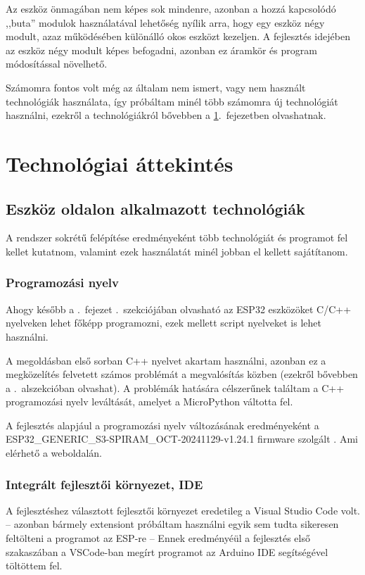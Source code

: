 \documentclass{thesis-ekf}
\theoremstyle{definition}
\theoremstyle{remark}
\begin{document}
	Az eszköz önmagában nem képes sok mindenre, azonban a hozzá kapcsolódó ,,buta'' modulok használatával lehetőség nyílik arra, hogy egy eszköz négy modult, azaz működésében különálló okos eszközt kezeljen.
	A fejlesztés idejében az eszköz négy modult képes befogadni, azonban ez áramkör és program módosítással növelhető.
	
	Számomra fontos volt még az általam nem ismert, vagy nem használt technológiák használata, így próbáltam minél több számomra új technológiát használni, ezekről a technológiákról bővebben a \ref{ch_tech}.~fejezetben olvashatnak.
	\chapter{Technológiai áttekintés}
	\label{ch_tech}
	\section{Eszköz oldalon alkalmazott technológiák}
	A rendszer sokrétű felépítése eredményeként több technológiát és programot fel kellet kutatnom, valamint ezek használatát minél jobban el kellett sajátítanom.
	\subsection{Programozási nyelv}
	Ahogy később a .~fejezet .~szekciójában olvasható az ESP32 eszközöket C/C++ nyelveken lehet főképp programozni, ezek mellett script nyelveket is lehet használni.
	
	A megoldásban első sorban C++ nyelvet akartam használni, azonban ez a megközelítés felvetett számos problémát a megvalósítás közben (ezekről bővebben a .~alszekcióban olvashat). A problémák hatására célszerűnek találtam a C++ programozási nyelv leváltását, amelyet a MicroPython váltotta fel.
	
	A fejlesztés alapjául a programozási nyelv változásának eredményeként a  ESP32\_GENERIC\_S3-SPIRAM\_OCT-20241129-v1.24.1 firmware szolgált . Ami elérhető a \href{https://micropython.org/download/}{\color{blue}{MicroPython}} weboldalán.
	\subsection{Integrált fejlesztői környezet, IDE}
	\label{ssec_ide_esp}
	A fejlesztéshez választott fejlesztői környezet eredetileg a Visual Studio Code volt. -- azonban bármely extensiont próbáltam használni egyik sem tudta sikeresen feltölteni a programot az ESP-re -- Ennek eredményéül a fejlesztés első szakaszában a VSCode-ban megírt programot az Arduino IDE segítségével töltöttem fel.
	
\end{document}
